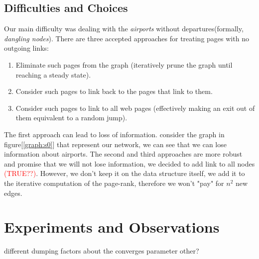 \documentclass[10pt, a4paper]{article}
\begin{document}
\subsection{Difficulties and Choices}
\noindent{}
Our main difficulty was dealing with the \textit{airports} without departures(formally, \textit{dangling nodes}). There are three accepted approaches for treating pages with no outgoing links\cite{pageRank}:
\begin{enumerate}
    \item Eliminate such pages from the graph (iteratively prune the graph until reaching a steady state).
    \item Consider such pages to link back to the pages that link to them.
    \item Consider such pages to link to all web pages (effectively making an exit out of them equivalent to a random jump).
\end{enumerate}
The first approach can lead to loss of information. consider the graph in figure[\ref{graph:s0}] that represent our network, we can see that we can lose information about airports. The second and third approaches are more robust and promise that we will not lose information, we decided to add link to all nodes \textcolor{red}{(TRUE??)}. However, we don't keep it on the data structure itself, we add it to the iterative computation of the page-rank, therefore we won't "pay" for $n^2$ new edges.


\section{Experiments and Observations}
different dumping factors
about the converges parameter
other?


\newpage
\nocite{*}


\end{document}
